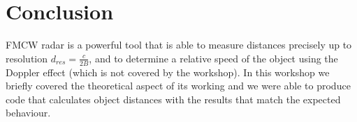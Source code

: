 \documentclass{article}
\begin{document}
\section{Conclusion}\label{sec:conclusion}
FMCW radar is a powerful tool that is able to measure distances precisely up to resolution $d_{res} = \frac{c}{2B}$, and to determine a relative speed of the object using the Doppler effect (which is not covered by the workshop).
In this workshop we briefly covered the theoretical aspect of its working and we were able to produce code that calculates object distances with the results that match the expected behaviour.

%
%
\end{document}
